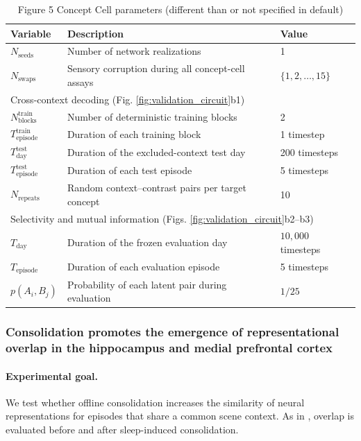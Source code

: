 \documentclass{article}
\begin{document}
\begin{table}[h!]
\centering
\caption{Figure 5 Concept Cell parameters (different than or not specified in default)}
\label{tab:figure_5_concept_cells}
\begin{tabular}{lll}
\toprule
\textbf{Variable} & \textbf{Description} & \textbf{Value} \\
\midrule
$N_{\textrm{seeds}}$ & Number of network realizations & 1 \\
$N_{\textrm{swaps}}$ & Sensory corruption during all concept-cell assays & $\{1,2,\ldots,15\}$ \\
\midrule
\multicolumn{3}{l}{Cross-context decoding (Fig. \ref{fig:validation_circuit}b1)} \\
 $N_{\textrm{blocks}}^{\textrm{train}}$ & Number of deterministic training blocks & 2 \\
$T_{\textrm{episode}}^{\textrm{train}}$ & Duration of each training block & 1 timestep \\
$T_{\textrm{day}}^{\textrm{test}}$ & Duration of the excluded-context test day & 200 timesteps \\
$T_{\textrm{episode}}^{\textrm{test}}$ & Duration of each test episode & 5 timesteps \\
$N_{\textrm{repeats}}$ & Random context--contrast pairs per target concept & 10 \\
\midrule
\multicolumn{3}{l}{Selectivity and mutual information (Figs. \ref{fig:validation_circuit}b2--b3)} \\
$T_{\textrm{day}}$ & Duration of the frozen evaluation day & $10{,}000$ timesteps \\
$T_{\textrm{episode}}$ & Duration of each evaluation episode & 5 timesteps \\
$p(A_i,B_j)$ & Probability of each latent pair during evaluation & $1/25$ \\
\bottomrule
\end{tabular}
\end{table}
\subsubsection*{Consolidation promotes the emergence of representational overlap in the hippocampus and medial prefrontal cortex }

\paragraph{Experimental goal.}
We test whether offline consolidation increases the similarity of neural representations for episodes that share a common scene context. As in , overlap is evaluated before and after sleep-induced consolidation.
\end{document}
